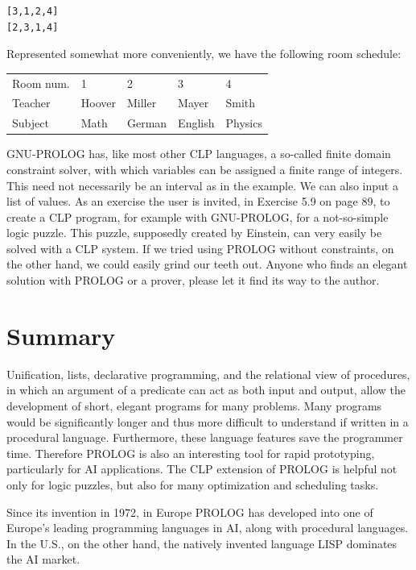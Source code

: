 \documentclass[10pt]{book}
\begin{document}
\begin{verbatim}
[3,1,2,4]
[2,3,1,4]
\end{verbatim}

Represented somewhat more conveniently, we have the following room schedule:

\begin{center}
\begin{tabular}{lllll}
\hline
Room num. & 1 & 2 & 3 & 4 \\\index{Linearly separable}\index{Linearly separable}
\hline
Teacher & Hoover & Miller & Mayer & Smith \\
\hline
Subject & Math & German & English & Physics \\
\hline
\end{tabular}
\end{center}

GNU-PROLOG has, like most other CLP languages, a so-called finite domain constraint solver, with which variables can be assigned a finite range of integers. This need not necessarily be an interval as in the example. We can also input a list of values. As an exercise the user is invited, in Exercise 5.9 on page 89, to create a CLP program, for example with GNU-PROLOG, for a not-so-simple logic puzzle. This puzzle, supposedly created by Einstein, can very easily be solved with a CLP system. If we tried using PROLOG without constraints, on the other hand, we could easily grind our teeth out. Anyone who finds an elegant solution with PROLOG or a prover, please let it find its way to the author.

\section{Summary}
Unification, lists, declarative programming, and the relational view of procedures, in which an argument of a predicate can act as both input and output, allow the development of short, elegant programs for many problems. Many programs would be significantly longer and thus more difficult to understand if written in a procedural language. Furthermore, these language features save the programmer time. Therefore PROLOG is also an interesting tool for rapid prototyping, particularly for AI applications. The CLP extension of PROLOG is helpful not only for logic puzzles, but also for many optimization and scheduling tasks.

Since its invention in 1972, in Europe PROLOG has developed into one of Europe's leading programming languages in AI, along with procedural languages. In the U.S., on the other hand, the natively invented language LISP dominates the AI market.
\end{document}
